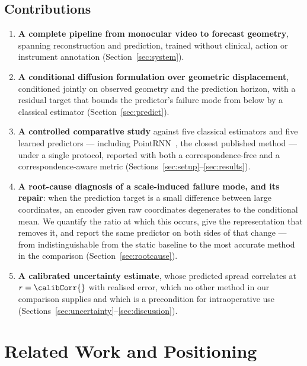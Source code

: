 \documentclass[conference]{IEEEtran}
\begin{document}
\subsection{Contributions}
\begin{enumerate}
\item \textbf{A complete pipeline from monocular video to forecast geometry},
      spanning reconstruction and prediction, trained without clinical, action or
      instrument annotation (Section~\ref{sec:system}).
\item \textbf{A conditional diffusion formulation over geometric displacement},
      conditioned jointly on observed geometry and the prediction horizon, with a
      residual target that bounds the predictor's failure mode from below by a
      classical estimator (Section~\ref{sec:predict}).
\item \textbf{A controlled comparative study} against five classical estimators and
      five learned predictors --- including PointRNN~\cite{fan2019pointrnn}, the
      closest published method --- under a single protocol, reported with both a
      correspondence-free and a correspondence-aware metric
      (Sections~\ref{sec:setup}--\ref{sec:results}).
\item \textbf{A root-cause diagnosis of a scale-induced failure mode, and its
      repair}: when the prediction target is a small difference between large
      coordinates, an encoder given raw coordinates degenerates to the conditional
      mean. We quantify the ratio at which this occurs, give the representation that
      removes it, and report the same predictor on both sides of that change ---
      from indistinguishable from the static baseline to the most accurate method in
      the comparison (Section~\ref{sec:rootcause}).
\item \textbf{A calibrated uncertainty estimate}, whose predicted spread correlates
      at $r=\calibCorr{}$ with realised error, which no other method in our
      comparison supplies and which is a precondition for intraoperative use
      (Sections~\ref{sec:uncertainty}--\ref{sec:discussion}).
\end{enumerate}

\section{Related Work and Positioning}
\label{sec:related}
\end{document}
